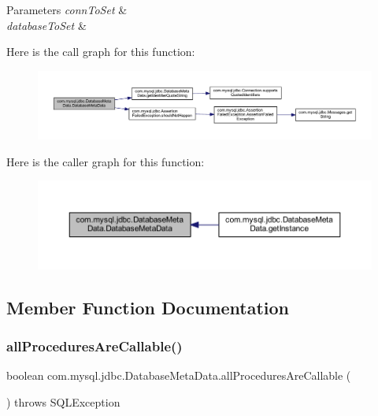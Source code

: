 \begin{DoxyParams}{Parameters}
{\em conn\+To\+Set} & \\
\hline
{\em database\+To\+Set} & \\
\hline
\end{DoxyParams}
Here is the call graph for this function\+:\nopagebreak
\begin{figure}[H]
\begin{center}
\leavevmode
\includegraphics[width=350pt]{classcom_1_1mysql_1_1jdbc_1_1_database_meta_data_a754255faffa1310c4d9507733583ae72_cgraph}
\end{center}
\end{figure}
Here is the caller graph for this function\+:\nopagebreak
\begin{figure}[H]
\begin{center}
\leavevmode
\includegraphics[width=350pt]{classcom_1_1mysql_1_1jdbc_1_1_database_meta_data_a754255faffa1310c4d9507733583ae72_icgraph}
\end{center}
\end{figure}


\subsection{Member Function Documentation}
\mbox{\label{classcom_1_1mysql_1_1jdbc_1_1_database_meta_data_a3edc654c645e8c0114f7a9ef9fb77184}} 
\subsubsection{\texorpdfstring{all\+Procedures\+Are\+Callable()}{allProceduresAreCallable()}}
{\footnotesize\ttfamily boolean com.\+mysql.\+jdbc.\+Database\+Meta\+Data.\+all\+Procedures\+Are\+Callable (\begin{DoxyParamCaption}{ }\end{DoxyParamCaption}) throws S\+Q\+L\+Exception}


